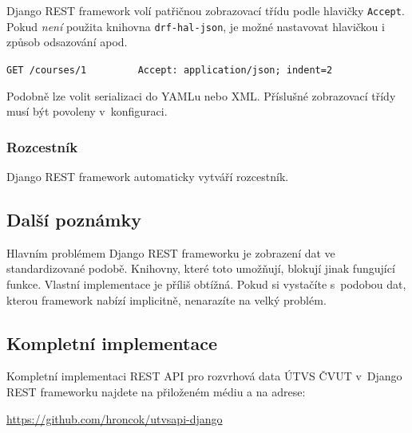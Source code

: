 Django REST framework volí patřičnou zobrazovací třídu podle hlavičky \verb!Accept!. Pokud \emph{není} použita knihovna \verb!drf-hal-json!, je možné nastavovat hlavičkou i způsob odsazování apod.

\verb!GET /courses/1         Accept: application/json; indent=2!

Podobně lze volit serializaci do YAMLu nebo XML. Příslušné zobrazovací třídy musí být povoleny v~konfiguraci.

\subsubsection*{Rozcestník}\label{rozcestnuxedk}

Django REST framework automaticky vytváří rozcestník.

\subsection{Další poznámky}\label{dalux161uxed-poznuxe1mky}

Hlavním problémem Django REST frameworku je zobrazení dat ve standardizované podobě. Knihovny, které toto umožňují, blokují jinak fungující funkce. Vlastní implementace je příliš obtížná. Pokud si vystačíte s~podobou dat, kterou framework nabízí implicitně, nenarazíte na velký problém.

\subsection{Kompletní implementace}\label{kompletnuxed-implementace}

Kompletní implementaci REST API pro rozvrhová data ÚTVS ČVUT v~Django REST frameworku najdete na přiloženém médiu a na adrese:

\url{https://github.com/hroncok/utvsapi-django}
